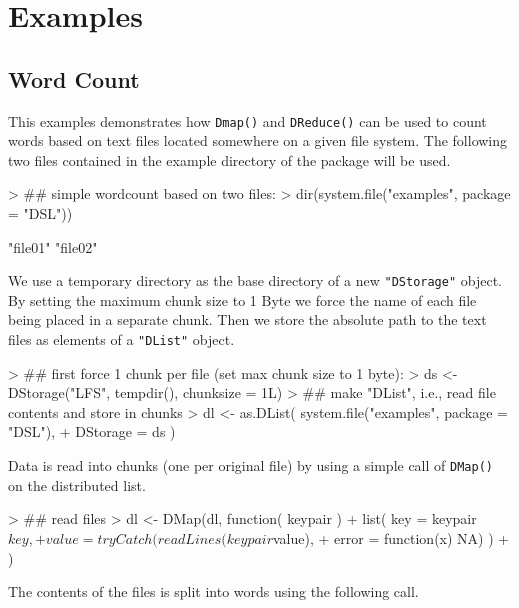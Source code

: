\documentclass[fleqn]{article}
\let\code=\texttt
\newcommand{\class}[1]{\code{"#1"}}
\begin{document}
\section{Examples}
\label{sec:examples}

\subsection{Word Count}

This examples demonstrates how \code{Dmap()} and \code{DReduce()} can
be used to count words based on text files located somewhere on a
given file system. The following two files contained in the example
directory of the package will be used.
\begin{Schunk}
\begin{Sinput}
> ## simple wordcount based on two files:
> dir(system.file("examples", package = "DSL"))
\end{Sinput}
\begin{Soutput}
[1] "file01" "file02"
\end{Soutput}
\end{Schunk}
We use a temporary directory as the base directory of a new \class{DStorage}
object. By setting the maximum chunk size to 1 Byte we force the name
of each file being placed in a separate chunk. Then we store the
absolute path to the text files as elements of a \class{DList} object.
\begin{Schunk}
\begin{Sinput}
> ## first force 1 chunk per file (set max chunk size to 1 byte):
> ds <- DStorage("LFS", tempdir(), chunksize = 1L)
> ## make "DList", i.e., read file contents and store in chunks
> dl <- as.DList( system.file("examples", package = "DSL"),
+                 DStorage = ds )
\end{Sinput}
\end{Schunk}
Data is read into chunks (one per original file) by using a simple
call of \code{DMap()} on the distributed list.
\begin{Schunk}
\begin{Sinput}
> ## read files
> dl <- DMap(dl, function( keypair ){
+     list( key = keypair$key,
+           value = tryCatch(readLines(keypair$value),
+                            error = function(x) NA) )
+ })
\end{Sinput}
\end{Schunk}
The contents of the files is split into words using the following call.
\end{document}
